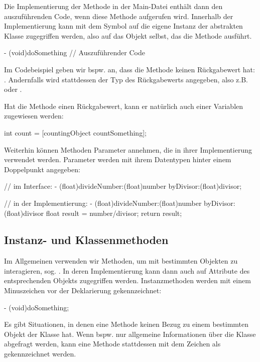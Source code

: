 \documentclass[parskip=half, final]{scrreprt}
\begin{document}
Die Implementierung der Methode in der Main-Datei enthält dann den auszuführenden Code, wenn diese Methode aufgerufen wird. Innerhalb der Implementierung kann mit dem Symbol  auf die eigene Instanz der abstrakten Klasse zugegriffen werden, also auf das Objekt selbst, das die Methode ausführt.
\begin{objclst}
- (void)doSomething {
    // Auszuführender Code
}
\end{objclst}

Im Codebeispiel  geben wir bspw. an, dass die Methode  keinen Rückgabewert hat: . Andernfalls wird stattdessen der Typ des Rückgabewerts angegeben, also z.B.  oder .

Hat die Methode einen Rückgabewert, kann er natürlich auch einer Variablen zugewiesen werden:
\begin{objclst}
int count = [countingObject countSomething];
\end{objclst}

Weiterhin können Methoden Parameter annehmen, die in ihrer Implementierung verwendet werden. Parameter werden mit ihrem Datentypen hinter einem Doppelpunkt angegeben:
\begin{objclst}
// im Interface:
- (float)divideNumber:(float)number byDivisor:(float)divisor;
\end{objclst}
\begin{objclst}
// in der Implementierung:
- (float)divideNumber:(float)number byDivisor:(float)divisor {
    float result = number/divisor;
    return result;
}
\end{objclst}

\subsection{Instanz- und Klassenmethoden}

Im Allgemeinen verwenden wir Methoden, um mit bestimmten Objekten zu interagieren, sog. . In deren Implementierung kann dann auch auf Attribute des entsprechenden Objekts zugegriffen werden. Instanzmethoden werden mit einem Minuszeichen \objc{-} vor der Deklarierung gekennzeichnet:
\begin{objclst}
- (void)doSomething;
\end{objclst}

Es gibt Situationen, in denen eine Methode keinen Bezug zu einem bestimmten Objekt der Klasse hat. Wenn bspw. nur allgemeine Informationen über die Klasse abgefragt werden, kann eine Methode stattdessen mit dem Zeichen \objc{+} als  gekennzeichnet werden.
\end{document}
